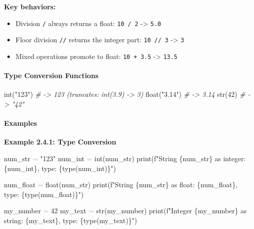 \documentclass[
  justified,
  openright,
]{tufte-book}
\let\subsection\paragraph
\let\paragraph\paragraph
\newcommand{\StringTok}[1]{\textcolor{CodeString}{#1}}              %
\newcommand{\CommentTok}[1]{\textcolor{CodeComment}{\textit{#1}}}  %
\newcommand{\CodeNumTok}[1]{\textcolor{CodeNumber}{#1}}             %
\newcommand{\OperatorTok}[1]{\textcolor{DarkGray}{#1}}              %
\newenvironment{Shaded}{%
  \begin{mdframed}[style=TufteCode]%
}{%
  \end{mdframed}%
}
\let\subsection\paragraph
\let\paragraph\paragraph
\providecommand{\tightlist}{%
  \setlength{\itemsep}{0pt}\setlength{\parskip}{0pt}}
\begin{document}
\textbf{Key behaviors:}

\begin{itemize}
\tightlist
\item
  Division \texttt{/} always returns a float: \texttt{10\ /\ 2}
  -\textgreater{} \texttt{5.0}
\item
  Floor division \texttt{//} returns the integer part:
  \texttt{10\ //\ 3} -\textgreater{} \texttt{3}
\item
  Mixed operations promote to float: \texttt{10\ +\ 3.5} -\textgreater{}
  \texttt{13.5}
\end{itemize}

\subsection{Type Conversion
Functions}\label{type-conversion-functions}

\begin{Shaded}
\begin{Highlighting}[]
int(\StringTok{"123"})      \CommentTok{\# {-}\textgreater{} 123  (truncates: int(3.9) {-}\textgreater{} 3)}
float(\StringTok{"3.14"})   \CommentTok{\# {-}\textgreater{} 3.14}
str(\CodeNumTok{42})         \CommentTok{\# {-}\textgreater{} "42"}
\end{Highlighting}
\end{Shaded}

\subsection{Examples}\label{examples-4}

\textbf{Example 2.4.1: Type Conversion}

\begin{Shaded}
\begin{Highlighting}[]
num\_str \OperatorTok{=} \StringTok{"123"}
num\_int \OperatorTok{=} int(num\_str)
print(\StringTok{f"String \textquotesingle{}}\StringTok{\{}num\_str\StringTok{\}}\StringTok{\textquotesingle{} as integer: }\StringTok{\{}num\_int\StringTok{\}}\StringTok{, type: }\StringTok{\{}type(num\_int)\StringTok{\}}\StringTok{"})
 
num\_float \OperatorTok{=} float(num\_str)
print(\StringTok{f"String \textquotesingle{}}\StringTok{\{}num\_str\StringTok{\}}\StringTok{\textquotesingle{} as float: }\StringTok{\{}num\_float\StringTok{\}}\StringTok{, type: }\StringTok{\{}type(num\_float)\StringTok{\}}\StringTok{"})
 
my\_number \OperatorTok{=} \CodeNumTok{42}
my\_text \OperatorTok{=} str(my\_number)
print(\StringTok{f"Integer }\StringTok{\{}my\_number\StringTok{\}}\StringTok{ as string: \textquotesingle{}}\StringTok{\{}my\_text\StringTok{\}}\StringTok{\textquotesingle{}, type: }\StringTok{\{}type(my\_text)\StringTok{\}}\StringTok{"})
\end{Highlighting}
\end{Shaded}
\end{document}

